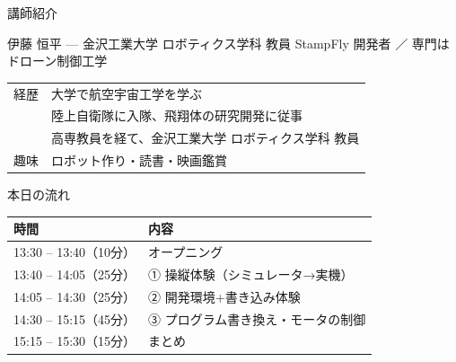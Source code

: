 
\begin{frame}{講師紹介}
  \begin{block}{伊藤 恒平 --- 金沢工業大学 ロボティクス学科 教員}
    \small StampFly 開発者 ／ 専門はドローン制御工学
  \end{block}

  \vspace{0.4em}

  \begin{table}
    \centering\small
    \begin{tabular}{l>{\raggedright\arraybackslash}p{92mm}}
      \hline
      経歴 & 大学で航空宇宙工学を学ぶ \\
           & 陸上自衛隊に入隊、飛翔体の研究開発に従事 \\
           & 高専教員を経て、金沢工業大学 ロボティクス学科 教員 \\
      \hline
      趣味 & ロボット作り・読書・映画鑑賞 \\
      \hline
    \end{tabular}
  \end{table}
\end{frame}

\begin{frame}{本日の流れ}
  \begin{table}
    \centering\small
    \begin{tabular}{ll}
      \hline
      \textbf{時間} & \textbf{内容} \\
      \hline
      13:30 -- 13:40（10分） & オープニング \\
      13:40 -- 14:05（25分） & ① 操縦体験（シミュレータ→実機） \\
      14:05 -- 14:30（25分） & ② 開発環境+書き込み体験 \\
      14:30 -- 15:15（45分） & ③ プログラム書き換え・モータの制御 \\
      15:15 -- 15:30（15分） & まとめ \\
      \hline
    \end{tabular}
  \end{table}

\end{frame}

